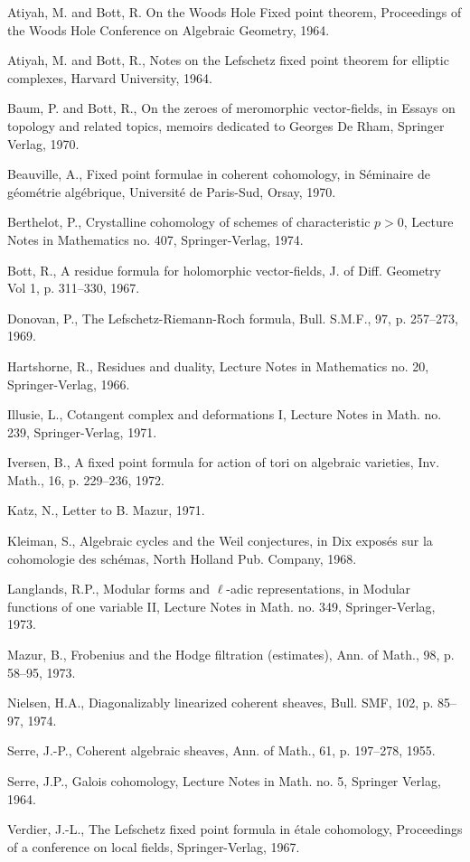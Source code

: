 \begin{enumerate}[label={[\arabic*]},leftmargin=3.5em]
\item Atiyah, M. and Bott, R. On the Woods Hole Fixed point theorem, Proceedings of the Woods Hole Conference on Algebraic Geometry, 1964.
\item Atiyah, M. and Bott, R., Notes on the Lefschetz fixed point theorem for elliptic complexes, Harvard University, 1964.
\item Baum, P. and Bott, R., On the zeroes of meromorphic vector-fields, in Essays on topology and related topics, memoirs dedicated to Georges De Rham, Springer Verlag, 1970.
\item Beauville, A., Fixed point formulae in coherent cohomology, in Séminaire de géométrie algébrique, Université de Paris-Sud, Orsay, 1970.
\item Berthelot, P., Crystalline cohomology of schemes of characteristic $p>0$, Lecture Notes in Mathematics no. 407, Springer-Verlag, 1974.
\item Bott, R., A residue formula for holomorphic vector-fields, J. of Diff. Geometry Vol 1, p. 311--330, 1967.
\item Donovan, P., The Lefschetz-Riemann-Roch formula, Bull. S.M.F., 97, p. 257--273, 1969.
\item Hartshorne, R., Residues and duality, Lecture Notes in Mathematics no. 20, Springer-Verlag, 1966.
\item Illusie, L., Cotangent complex and deformations I, Lecture Notes in Math. no. 239, Springer-Verlag, 1971.
\item Iversen, B., A fixed point formula for action of tori on algebraic varieties, Inv. Math., 16, p. 229--236, 1972.
\item Katz, N., Letter to B. Mazur, 1971.
\item Kleiman, S., Algebraic cycles and the Weil conjectures, in Dix exposés sur la cohomologie des schémas, North Holland Pub. Company, 1968.
\item Langlands, R.P., Modular forms and $\ell$-adic representations, in Modular functions of one variable II, Lecture Notes in Math. no. 349, Springer-Verlag, 1973.
\item Mazur, B., Frobenius and the Hodge filtration (estimates), Ann. of Math., 98, p. 58--95, 1973.
\item Nielsen, H.A., Diagonalizably linearized coherent sheaves, Bull. SMF, 102, p. 85--97, 1974.
\item Serre, J.-P., Coherent algebraic sheaves, Ann. of Math., 61, p. 197--278, 1955.
\item Serre, J.P., Galois cohomology, Lecture Notes in Math. no. 5, Springer Verlag, 1964.
\item Verdier, J.-L., The Lefschetz fixed point formula in étale cohomology, Proceedings of a conference on local fields, Springer-Verlag, 1967.
\end{enumerate}

